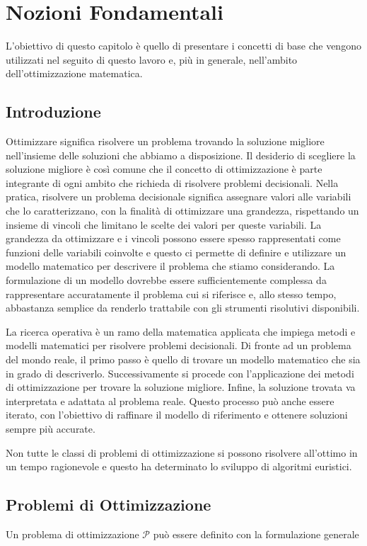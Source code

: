 \chapter{Nozioni Fondamentali}
L'obiettivo di questo capitolo è quello di presentare i concetti di base
che vengono utilizzati nel seguito di questo lavoro e, più in generale,
nell'ambito dell'ottimizzazione matematica.

\section{Introduzione}
Ottimizzare significa risolvere un problema trovando la soluzione migliore
nell'insieme delle soluzioni che abbiamo a disposizione. Il desiderio di
scegliere la soluzione migliore è così comune che il concetto di
ottimizzazione è parte integrante di ogni ambito che richieda di risolvere
problemi decisionali. Nella pratica, risolvere un problema decisionale
significa assegnare valori alle variabili che lo caratterizzano, con
la finalità di ottimizzare una grandezza, rispettando un insieme di
vincoli che limitano le scelte dei valori per queste variabili. La
grandezza da ottimizzare e i vincoli possono essere spesso
rappresentati come funzioni delle variabili coinvolte e questo ci permette
di definire e utilizzare un modello matematico per descrivere il problema che stiamo
considerando. La formulazione di un modello dovrebbe essere
sufficientemente complessa da rappresentare accuratamente il problema cui
si riferisce e, allo stesso tempo, abbastanza semplice da renderlo
trattabile con gli strumenti risolutivi disponibili.

La ricerca operativa è un ramo della matematica applicata che impiega
metodi e modelli matematici per risolvere problemi decisionali. Di fronte
ad un problema del mondo reale, il primo passo è quello di trovare un modello
matematico che sia in grado di descriverlo. Successivamente si procede con
l'applicazione dei metodi di ottimizzazione per trovare la soluzione
migliore. Infine, la soluzione trovata va interpretata e adattata al
problema reale. Questo processo può anche essere iterato, con l'obiettivo di
raffinare il modello di riferimento e ottenere
soluzioni sempre più accurate.

Non tutte le classi di problemi di ottimizzazione si possono risolvere
all'ottimo in un tempo ragionevole e questo ha determinato lo sviluppo di
algoritmi euristici.

\section{Problemi di Ottimizzazione}
Un problema di ottimizzazione $\mathcal{P}$ può essere definito con la
formulazione generale

